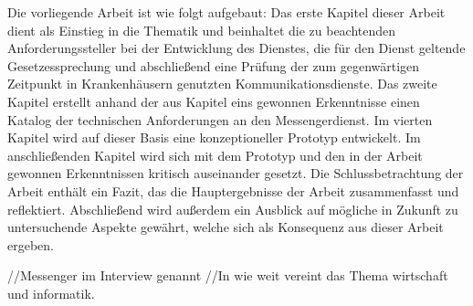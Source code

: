 Die vorliegende Arbeit ist wie folgt aufgebaut: Das erste Kapitel dieser Arbeit dient als Einstieg in die Thematik und beinhaltet die zu beachtenden Anforderungssteller bei der Entwicklung des Dienstes, die für den Dienst geltende Gesetzessprechung und abschließend eine Prüfung der zum gegenwärtigen Zeitpunkt in Krankenhäusern genutzten Kommunikationsdienste. Das zweite Kapitel erstellt anhand der aus Kapitel eins gewonnen Erkenntnisse einen Katalog der technischen Anforderungen an den Messengerdienst. Im vierten Kapitel wird auf dieser Basis eine konzeptioneller Prototyp entwickelt. Im anschließenden Kapitel wird sich mit dem Prototyp und den in der Arbeit gewonnen Erkenntnissen kritisch auseinander gesetzt. Die Schlussbetrachtung der Arbeit enthält ein Fazit, das die Hauptergebnisse der Arbeit zusammenfasst und reflektiert. Abschließend wird außerdem ein Ausblick auf mögliche in Zukunft zu untersuchende Aspekte gewährt, welche sich als Konsequenz aus dieser Arbeit ergeben.


//Messenger im Interview genannt
//In wie weit vereint das Thema wirtschaft und informatik. 